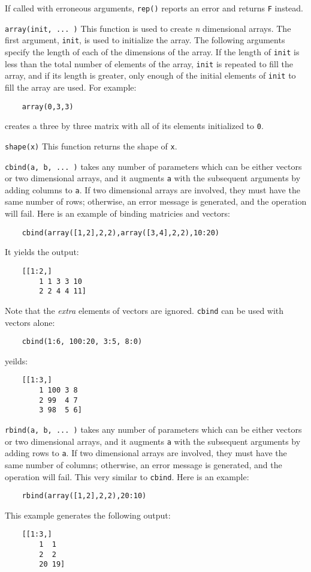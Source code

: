 \begin{sloppy}
\begin{list}{}{}
If called with erroneous arguments, {\tt rep()} reports an
error and returns {\tt F} instead.

\item[{\tt array(init, ... )}] \label{array-func} 
This function is used to create {\em n} dimensional arrays. The
first argument, {\tt init}, is used to initialize the array. The
following arguments specify the length of each of the dimensions
of the array. If the length of {\tt init} is less than the total
number of elements of the array, {\tt init} is repeated to
fill the array, and if its length is greater, only enough of the
initial elements of {\tt init} to fill the array are used.
For example:
\begin{verbatim}
    array(0,3,3)
\end{verbatim}
creates a three by three matrix with all of its elements
initialized to {\tt 0}.

\item[{\tt shape(x)}] \label{shape-func} 
This function returns the shape of {\tt x}.

\item[{\tt cbind(a, b, ... )}] \label{cbind-func} 
takes any number of parameters which can be either vectors or two
dimensional arrays, and it augments {\tt a} with the subsequent
arguments by adding columns to {\tt a}. If two dimensional arrays
are involved, they must have the same number of rows; otherwise, an
error message is generated, and the operation will fail. Here
is an example of binding matricies and vectors:
\begin{verbatim}
    cbind(array([1,2],2,2),array([3,4],2,2),10:20)
\end{verbatim}
It yields the output:
\begin{verbatim}
    [[1:2,]
        1 1 3 3 10
        2 2 4 4 11]
\end{verbatim}
Note that the {\em extra} elements of vectors are ignored. {\tt cbind}
can be used with vectors alone:
\begin{verbatim}
    cbind(1:6, 100:20, 3:5, 8:0)
\end{verbatim}
yeilds:
\begin{verbatim}
    [[1:3,]
        1 100 3 8
        2 99  4 7
        3 98  5 6] 
\end{verbatim}

\item[{\tt rbind(a, b, ... )}] \label{rbind-func} 
takes any number of parameters which can be either vectors or two
dimensional arrays, and it augments {\tt a} with the subsequent
arguments by adding rows to {\tt a}.  If two dimensional arrays are
involved, they must have the same number of columns; otherwise, an
error message is generated, and the operation will fail. This
very similar to {\tt cbind}. Here is an example:
\begin{verbatim}
    rbind(array([1,2],2,2),20:10)
\end{verbatim}
This example generates the following output:
\begin{verbatim}
    [[1:3,]
        1  1
        2  2
        20 19] 
\end{verbatim}


\end{list}
\end{sloppy}
